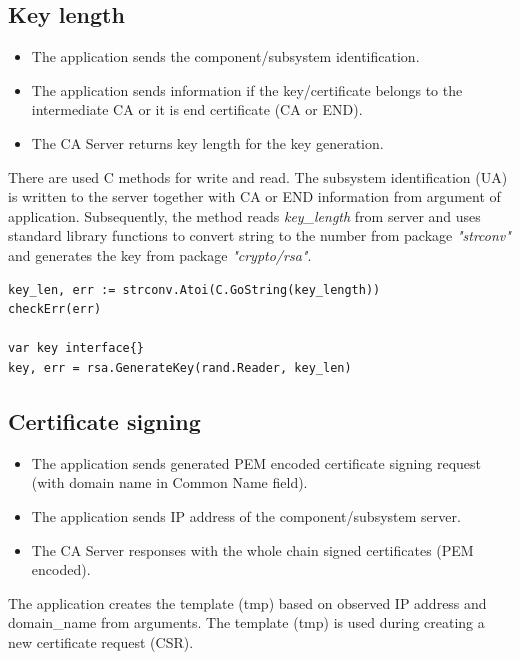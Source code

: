 \documentclass[
  oneside, 12pt, 
  printed, %
  notable,   %
  nolof,     %
  nolot,     %
]{fithesis3}
\begin{document}
\subsection{Key length}
\begin{itemize}[leftmargin=2em,rightmargin=1em,itemsep=0.75\parskip,parsep=0em,topsep=0em,partopsep=0em]
\item The application sends the component/subsystem identification.
\item The application sends information if the key/certificate belongs to the intermediate CA or it is end certificate (CA or END).
\item The CA Server returns key length for the key generation.
\end{itemize}
    
There are used C methods for write and read. The subsystem identification (UA) is written to the 
server together with CA or END information from argument of application. Subsequently, the method 
reads \textit{key\_length} from server and uses standard library functions to convert string to the 
number from package \textit{"strconv"} and generates the key from package \textit{"crypto/rsa"}.

\begin{lstlisting}
key_len, err := strconv.Atoi(C.GoString(key_length))	
checkErr(err)

var key interface{}
key, err = rsa.GenerateKey(rand.Reader, key_len)
\end{lstlisting}
    
\subsection{Certificate signing}
\begin{itemize}[leftmargin=2em,rightmargin=1em,itemsep=0.75\parskip,parsep=0em,topsep=0em,partopsep=0em]
\item The application sends generated PEM encoded certificate signing request (with domain name in Common Name field).
\item The application sends IP address of the component/subsystem server.
\item The CA Server responses with the whole chain signed certificates (PEM encoded).
\end{itemize}

The application creates the template (tmp) based on observed IP address and domain\_name from 
arguments. The template (tmp) is used during creating a new certificate request (CSR). 
\end{document}
